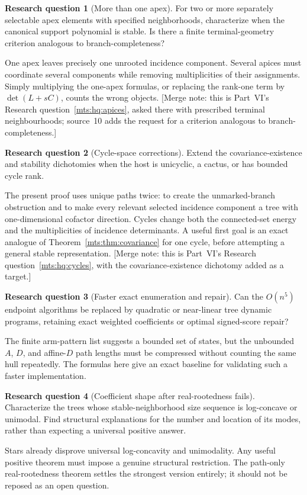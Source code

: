 \documentclass[11pt]{article}
\numberwithin{equation}{section}
\theoremstyle{definition}
\newtheorem{question}{Research question}%
\begin{document}
\begin{question}[More than one apex]\label{mts:q:apices}
For two or more separately selectable apex elements with specified
neighborhoods, characterize when the canonical support polynomial is
stable. Is there a finite terminal-geometry criterion analogous to
branch-completeness?
\end{question}
One apex leaves precisely one unrooted incidence component. Several apices
must coordinate several components while removing multiplicities of their
assignments. Simply multiplying the one-apex formulas, or replacing the
rank-one term by $\det(L+sC)$, counts the wrong objects.
[Merge note: this is Part~VI's Research question~\ref{mts:hq:apices},
asked there with prescribed terminal neighbourhoods; source~10 adds the
request for a criterion analogous to branch-completeness.]

\begin{question}[Cycle-space corrections]\label{mts:q:cycles}
Extend the covariance-existence and stability dichotomies when the host
is unicyclic, a cactus, or has bounded cycle rank.
\end{question}
The present proof uses unique paths twice: to create the unmarked-branch
obstruction and to make every relevant selected incidence component a
tree with one-dimensional cofactor direction. Cycles change both the
connected-set energy and the multiplicities of incidence determinants.
A useful first goal is an exact analogue of Theorem~\ref{mts:thm:covariance} for one
cycle, before attempting a general stable representation.
[Merge note: this is Part~VI's Research question~\ref{mts:hq:cycles}, with
the covariance-existence dichotomy added as a target.]

\begin{question}[Faster exact enumeration and repair]\label{mts:q:faster}
Can the $O(n^5)$ endpoint algorithms be replaced by quadratic or near-linear
tree dynamic programs, retaining exact weighted coefficients or optimal
signed-score repair?
\end{question}
The finite arm-pattern list suggests a bounded set of states, but the
unbounded $A$, $D$, and affine-$D$ path lengths must be compressed without
counting the same hull repeatedly. The formulas here give an exact
baseline for validating such a faster implementation.

\begin{question}[Coefficient shape after real-rootedness fails]\label{mts:q:shape}
Characterize the trees whose stable-neighborhood size sequence is
log-concave or unimodal. Find structural explanations for the number and
location of its modes, rather than expecting a universal positive answer.
\end{question}
Stars already disprove universal log-concavity and unimodality. Any useful
positive theorem must impose a genuine structural restriction. The
path-only real-rootedness theorem settles the strongest version entirely;
it should not be reposed as an open question.
\end{document}
